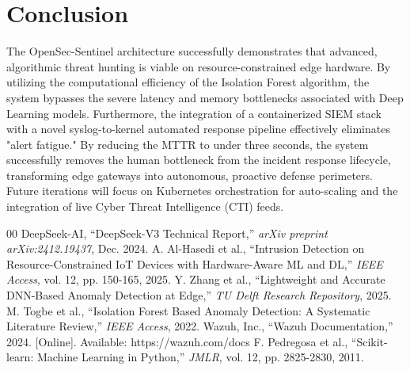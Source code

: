 \documentclass[conference]{IEEEtran}
\begin{document}
	\section{Conclusion}
	The OpenSec-Sentinel architecture successfully demonstrates that advanced, algorithmic threat hunting is viable on resource-constrained edge hardware. By utilizing the computational efficiency of the Isolation Forest algorithm, the system bypasses the severe latency and memory bottlenecks associated with Deep Learning models. Furthermore, the integration of a containerized SIEM stack with a novel syslog-to-kernel automated response pipeline effectively eliminates "alert fatigue." By reducing the MTTR to under three seconds, the system successfully removes the human bottleneck from the incident response lifecycle, transforming edge gateways into autonomous, proactive defense perimeters. Future iterations will focus on Kubernetes orchestration for auto-scaling and the integration of live Cyber Threat Intelligence (CTI) feeds.
	
	\begin{thebibliography}{00}
		 DeepSeek-AI, ``DeepSeek-V3 Technical Report,'' \textit{arXiv preprint arXiv:2412.19437}, Dec. 2024.
		 A. Al-Hasedi et al., ``Intrusion Detection on Resource-Constrained IoT Devices with Hardware-Aware ML and DL,'' \textit{IEEE Access}, vol. 12, pp. 150-165, 2025.
		 Y. Zhang et al., ``Lightweight and Accurate DNN-Based Anomaly Detection at Edge,'' \textit{TU Delft Research Repository}, 2025.
		 M. Togbe et al., ``Isolation Forest Based Anomaly Detection: A Systematic Literature Review,'' \textit{IEEE Access}, 2022.
		 Wazuh, Inc., ``Wazuh Documentation,'' 2024. [Online]. Available: https://wazuh.com/docs
		 F. Pedregosa et al., ``Scikit-learn: Machine Learning in Python,'' \textit{JMLR}, vol. 12, pp. 2825-2830, 2011.
	\end{thebibliography}
	
\end{document}
